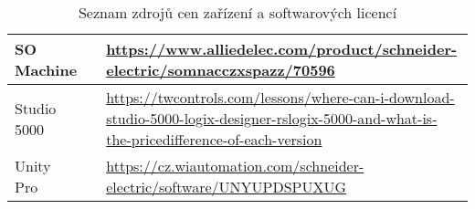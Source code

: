 \begin{table}[H]
{\begin{tabular}{|C{4cm}|C{2.5cm}|C{9.5cm}|}
        SO Machine &  & \url{https://www.alliedelec.com/product/schneider-electric/somnacczxspazz/70596} \\\hline
        Studio 5000 &  &  \url{https://twcontrols.com/lessons/where-can-i-download-studio-5000-logix-designer-rslogix-5000-and-what-is-the-pricedifference-of-each-version}\\\hline
        Unity Pro &  &  \url{https://cz.wiautomation.com/schneider-electric/software/UNYUPDSPUXUG} \\\hline
    \end{tabular}
    }
    \caption{Seznam zdrojů cen zařízení a softwarových licencí}
    \label{tab:device_prices}
\end{table}